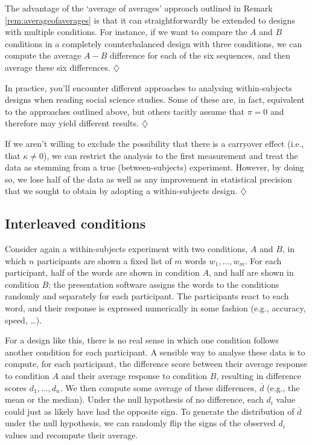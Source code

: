 \documentclass[a4paper]{tufte-book}\usepackage[]{graphicx}\usepackage[]{xcolor}
\newcommand*{\parend}[1][$\diamondsuit$]{%
  \unskip\nobreak\hspace{1em plus 1fill}$\diamondsuit$%
}
\begin{document}
  The advantage of the `average of averages' approach outlined in
  Remark \ref{rem:averageofaverages} is that it can straightforwardly
  be extended to designs with multiple conditions.
  For instance, if we want to compare the $A$ and $B$ conditions in a
  completely counterbalanced design with three conditions,
  we can compute the average $A - B$ difference for each of the six
  sequences, and then average these six differences.
\parend

In practice, you'll encounter different approaches to analysing within-subjects 
designs when reading social science studies.
Some of these are, in fact, equivalent to the approaches outlined above,
but others tacitly assume that $\pi = 0$ and therefore may yield different
results.
\parend

  If we aren't willing to exclude the possibility that there is 
  a carryover effect (i.e., that $\kappa \neq 0$),
  we can restrict the analysis to the first measurement
  and treat the data as stemming from a true (between-subjects) experiment.
  However, by doing so, we lose half of the data as well as
  any improvement in statistical precision that we sought to obtain
  by adopting a within-subjects design.
\parend

\subsection{Interleaved conditions}
Consider again a within-subjects experiment with two conditions, $A$ and $B$,
in which $n$ participants are shown a fixed list of $m$ words $w_1, \dots, w_m$.
For each participant, half of the words are shown in condition $A$,
and half are shown in condition $B$;
the presentation software assigns the words to the conditions randomly
and separately for each participant.
The participants react to each word, and their response is expressed numerically
in some fashion (e.g., accuracy, speed, \dots).

For a design like this, there is no real sense in which one condition
follows another condition for each participant.
A sensible way to analyse these data is to compute, for each participant,
the difference score between their average response to condition $A$
and their average response to condition $B$, resulting in difference
scores $d_1, \dots, d_n$.
We then compute some average of these differences, $\overline d$
(e.g., the mean or the median).
Under the null hypothesis of no difference,
each $d_i$ value could just as likely have had the opposite sign.
To generate the distribution of $\overline d$ under the null hypothesis,
we can randomly flip the signs of the observed $d_i$ values
and recompute their average.
\end{document}
